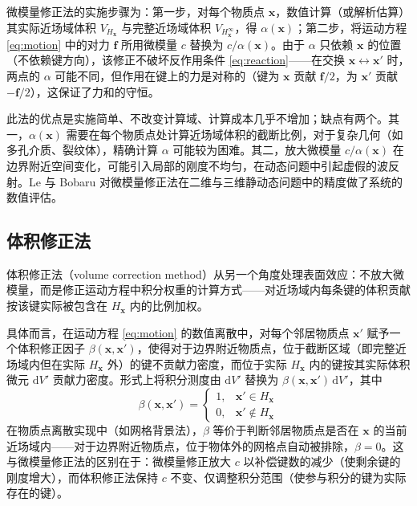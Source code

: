 微模量修正法的实施步骤为：第一步，对每个物质点 $\mathbf{x}$，数值计算（或解析估算）其实际近场域体积 $V_{H_{\mathbf{x}}}$ 与完整近场域体积 $V_{H_{\mathbf{x}}^{\infty}}$，得 $\alpha(\mathbf{x})$；第二步，将运动方程 \eqref{eq:motion} 中的对力 $\mathbf{f}$ 所用微模量 $c$ 替换为 $c/\alpha(\mathbf{x})$。由于 $\alpha$ 只依赖 $\mathbf{x}$ 的位置（不依赖键方向），该修正不破坏反作用条件 \eqref{eq:reaction}——在交换 $\mathbf{x}\leftrightarrow\mathbf{x}'$ 时，两点的 $\alpha$ 可能不同，但作用在键上的力是对称的（键为 $\mathbf{x}$ 贡献 $\mathbf{f}/2$，为 $\mathbf{x}'$ 贡献 $-\mathbf{f}/2$），这保证了力和的守恒。

此法的优点是实施简单、不改变计算域、计算成本几乎不增加；缺点有两个。其一，$\alpha(\mathbf{x})$ 需要在每个物质点处计算近场域体积的截断比例，对于复杂几何（如多孔介质、裂纹体），精确计算 $\alpha$ 可能较为困难。其二，放大微模量 $c/\alpha(\mathbf{x})$ 在边界附近空间变化，可能引入局部的刚度不均匀，在动态问题中引起虚假的波反射。Le 与 Bobaru \cite{LeBobaru2018} 对微模量修正法在二维与三维静动态问题中的精度做了系统的数值评估。

\subsection{体积修正法}

体积修正法（volume correction method）从另一个角度处理表面效应：不放大微模量，而是修正运动方程中积分权重的计算方式——对近场域内每条键的体积贡献按该键实际被包含在 $H_{\mathbf{x}}$ 内的比例加权。

具体而言，在运动方程 \eqref{eq:motion} 的数值离散中，对每个邻居物质点 $\mathbf{x}'$ 赋予一个体积修正因子 $\beta(\mathbf{x},\mathbf{x}')$，使得对于边界附近物质点，位于截断区域（即完整近场域内但在实际 $H_{\mathbf{x}}$ 外）的键不贡献力密度，而位于实际 $H_{\mathbf{x}}$ 内的键按其实际体积微元 $\mathrm{d}V'$ 贡献力密度。形式上将积分测度由 $\mathrm{d}V'$ 替换为 $\beta(\mathbf{x},\mathbf{x}')\,\mathrm{d}V'$，其中
\begin{equation}
\beta(\mathbf{x},\mathbf{x}') = 
\begin{cases}
1, & \mathbf{x}'\in H_{\mathbf{x}}\\
0, & \mathbf{x}'\notin H_{\mathbf{x}}
\end{cases}
\label{eq:volume-beta}
\end{equation}
在物质点离散实现中（如网格背景法），$\beta$ 等价于判断邻居物质点是否在 $\mathbf{x}$ 的当前近场域内——对于边界附近物质点，位于物体外的网格点自动被排除，$\beta=0$。这与微模量修正法的区别在于：微模量修正放大 $c$ 以补偿键数的减少（使剩余键的刚度增大），而体积修正法保持 $c$ 不变、仅调整积分范围（使参与积分的键为实际存在的键）。

